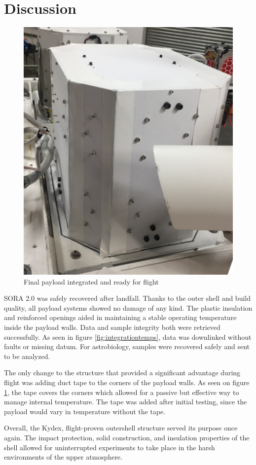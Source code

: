 \clearpage
\section{Discussion}
\label{sec:Discussion}
\begin{figure}[h!]
	\begin{center}
		\includegraphics[width=70 mm, scale=1]{figures/payload_integrated.JPG}
		\caption{Final payload integrated and ready for flight}
		\label{fig:payload_int}
	\end{center}
\end{figure}

SORA 2.0 was safely recovered after landfall.  Thanks to the outer shell and build quality, all payload systems showed no damage of any kind.  
The plastic insulation and reinforced openings aided in maintaining a stable operating temperature inside the payload walls.  
Data and sample integrity both were retrieved successfully.  As seen in figure \ref{fig:integrationtemps}, data was downlinked without faults or 
missing datum. For astrobiology, samples were recovered safely and sent to be analyzed.  

The only change to the structure that provided a significant advantage during flight was adding duct tape to the corners of the payload walls.  As seen on figure \ref{fig:payload_int}, the tape covers the corners which allowed for a passive but effective way to manage internal temperature.  The tape was added after initial testing, since the payload would vary in temperature without the tape.  

Overall, the Kydex, flight-proven outershell structure served its purpose once again.  The impact protection, solid construction, and insulation properties of the shell allowed for uninterrupted experiments to take place in the harsh environments of the upper atmosphere.